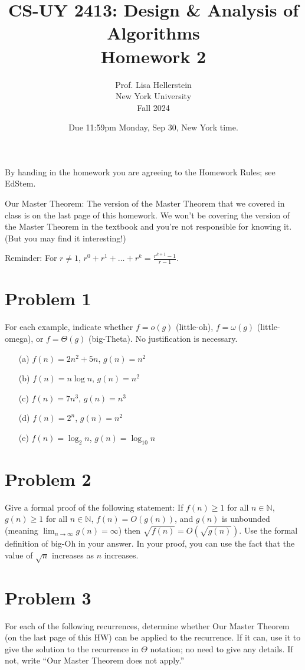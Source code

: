 \documentclass{article}
\title{CS-UY 2413: Design \& Analysis of Algorithms \\ Homework 2}
\author{Prof. Lisa Hellerstein \\ New York University \\ Fall 2024}
\date{Due 11:59pm Monday, Sep 30, New York time.}
\begin{document}
\maketitle

\noindent By handing in the homework you are agreeing to the Homework Rules; see EdStem.

\noindent Our Master Theorem: The version of the Master Theorem that we covered in class is on the last page of this homework. We won’t be covering the version of the Master Theorem in the textbook and you’re not responsible for knowing it. (But you may find it interesting!)

\noindent Reminder: For $r \neq 1$, $r^0 + r^1 + \dots + r^k = \frac{r^{k+1}-1}{r-1}$.

\section*{Problem 1}
For each example, indicate whether $f = o(g)$ (little-oh), $f = \omega(g)$ (little-omega), or $f = \Theta(g)$ (big-Theta). No justification is necessary.

\begin{enumerate}
    \item[(a)] $f(n) = 2n^2 + 5n$, $g(n) = n^2$
    \item[(b)] $f(n) = n \log n$, $g(n) = n^2$
    \item[(c)] $f(n) = 7n^3$, $g(n) = n^3$
    \item[(d)] $f(n) = 2^n$, $g(n) = n^2$
    \item[(e)] $f(n) = \log_2 n$, $g(n) = \log_{10} n$
\end{enumerate}

\section*{Problem 2}
Give a formal proof of the following statement: If $f(n) \ge 1$ for all $n \in \mathbb{N}$, $g(n) \ge 1$ for all $n \in \mathbb{N}$, $f(n) = O(g(n))$, and $g(n)$ is unbounded (meaning $\lim_{n \to \infty} g(n) = \infty$) then $\sqrt{f(n)} = O(\sqrt{g(n)})$.
Use the formal definition of big-Oh in your answer. In your proof, you can use the fact that the value of $\sqrt{n}$ increases as $n$ increases.


\section*{Problem 3}
For each of the following recurrences, determine whether Our Master Theorem (on the last page of this HW) can be applied to the recurrence. If it can, use it to give the solution to the recurrence in $\Theta$ notation; no need to give any details. If not, write “Our Master Theorem does not apply.”
\end{document}
